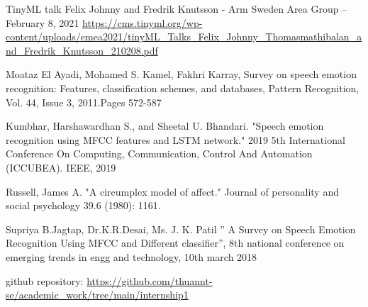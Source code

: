 \begin{thebibliography}{00}
TinyML talk Felix Johnny and Fredrik Knutsson - Arm Sweden Area Group – February 8, 2021
\url{https://cms.tinyml.org/wp-content/uploads/emea2021/tinyML_Talks_Felix_Johnny_Thomasmathibalan_and_Fredrik_Knutsson_210208.pdf}

Moataz El Ayadi, Mohamed S. Kamel, Fakhri Karray, Survey on speech emotion recognition: Features, classification schemes, and databases, Pattern Recognition, Vol. 44, Issue 3, 2011.Pages 572-587

Kumbhar, Harshawardhan S., and Sheetal U. Bhandari. "Speech emotion recognition using MFCC features and LSTM network." 2019 5th International Conference On Computing, Communication, Control And Automation (ICCUBEA). IEEE, 2019

Russell, James A. "A circumplex model of affect." Journal of personality and social psychology 39.6 (1980): 1161.

Supriya B.Jagtap, Dr.K.R.Desai, Ms. J. K. Patil ” A Survey on Speech Emotion Recognition Using MFCC and Different classifier”, 8th national conference on emerging trends in engg and technology, 10th march 2018

github repository: \url{https://github.com/thuannt-se/academic_work/tree/main/internship1}

\end{thebibliography}